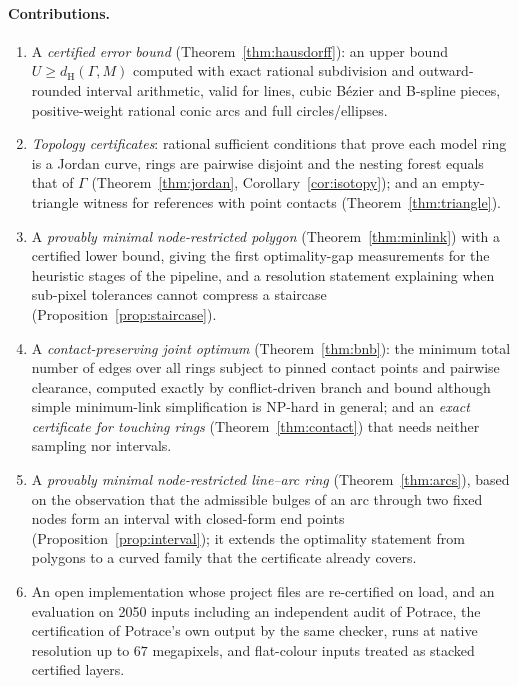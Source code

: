 \documentclass[11pt,a4paper]{article}
\theoremstyle{definition}
\theoremstyle{remark}
\newcommand{\dH}{d_{\mathrm{H}}}
\begin{document}
\paragraph{Contributions.}
\begin{enumerate}
\item A \emph{certified error bound} (Theorem~\ref{thm:hausdorff}): an upper
  bound $U\ge\dH(\Gamma,M)$ computed with exact rational subdivision and
  outward-rounded interval arithmetic, valid for lines, cubic B\'ezier and
  B-spline pieces, positive-weight rational conic arcs and full
  circles/ellipses.
\item \emph{Topology certificates}: rational sufficient conditions that prove
  each model ring is a Jordan curve, rings are pairwise disjoint and the nesting
  forest equals that of $\Gamma$ (Theorem~\ref{thm:jordan},
  Corollary~\ref{cor:isotopy}); and an empty-triangle witness for references
  with point contacts (Theorem~\ref{thm:triangle}).
\item A \emph{provably minimal node-restricted polygon}
  (Theorem~\ref{thm:minlink}) with a certified lower bound, giving the first
  optimality-gap measurements for the heuristic stages of the pipeline, and a
  resolution statement explaining when sub-pixel tolerances cannot compress a
  staircase (Proposition~\ref{prop:staircase}).
\item A \emph{contact-preserving joint optimum} (Theorem~\ref{thm:bnb}): the
  minimum total number of edges over all rings subject to pinned contact
  points and pairwise clearance, computed exactly by conflict-driven
  branch and bound although simple minimum-link simplification is NP-hard in
  general; and an \emph{exact certificate for touching rings}
  (Theorem~\ref{thm:contact}) that needs neither sampling nor intervals.
\item A \emph{provably minimal node-restricted line--arc ring}
  (Theorem~\ref{thm:arcs}), based on the observation that the admissible
  bulges of an arc through two fixed nodes form an interval with closed-form
  end points (Proposition~\ref{prop:interval}); it extends the optimality
  statement from polygons to a curved family that the certificate already
  covers.
\item An open implementation whose project files are re-certified on load, and
  an evaluation on 2050 inputs including an independent audit of Potrace, the
  certification of Potrace's own output by the same checker, runs at native
  resolution up to $67$ megapixels, and flat-colour inputs treated as stacked
  certified layers.
\end{enumerate}
\end{document}
